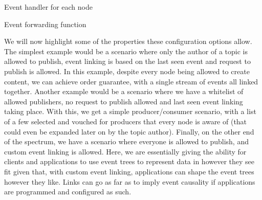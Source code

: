 \begin{algorithm}
  \SetAlgoLined
  \caption{Event handler for each node}
    \label{alg:receive-event}
\end{algorithm}

\begin{algorithm}
  \SetAlgoLined
  \caption{Event forwarding function}
    \label{alg:send-event}
\end{algorithm}

We will now highlight some of the properties these configuration options allow.
The simplest example would be a scenario where only the author of a topic is
allowed to publish, event linking is based on the last seen event and request
to publish is allowed. In this example, despite every node being allowed to
create content, we can achieve order guarantee, with a single stream of events
all linked together. Another example would be a scenario where we have a
whitelist of allowed publishers, no request to publish allowed and last seen
event linking taking place. With this, we get a simple producer/consumer
scenario, with a list of a few selected and vouched for producers that every
node is aware of (that could even be expanded later on by the topic author).
Finally, on the other end of the spectrum, we have a scenario where everyone is
allowed to publish, and custom event linking is allowed. Here, we are
essentially giving the ability for clients and applications to use event trees
to represent data in however they see fit given that, with custom event
linking, applications can shape the event trees however they like. Links can go
as far as to imply event causality if applications are programmed and
configured as such.
